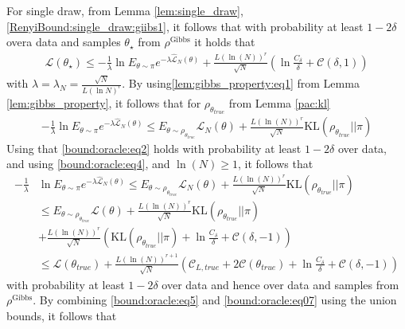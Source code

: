 \documentclass{article}
\newcommand{\KL}{\mathrm{KL}}
\renewcommand{\KL}{\mathrm{KL}}
\begin{document}
 For single draw, from Lemma \ref{lem:single_draw}, \eqref{RenyiBound:single_draw:giibs1}, it follows that
 with probability at least $1-2\delta$ overa data and samples $\theta_{\star}$ from $\rho^{\text{Gibbs}}$
 it holds that 
 \begin{align}
  \mathcal{L}(\theta_{\star}) \le   -\frac{1}{\lambda} \ln E_{\theta \sim \pi} e^{-\lambda \hat{\mathcal{L}}_N(\theta)} + 
 \frac{L(\ln(N))^{r}}{\sqrt{N}}\left(\ln\frac{C_{\delta}}{\delta} +  \mathcal{C}(\delta,1)\right)
      \label{bound:oracle:eq5}
 \end{align}
 with $\lambda=\lambda_N=\frac{\sqrt{N}}{L(\ln{N})^r}$. 
 By using\eqref{lem:gibbs_property:eq1} from  Lemma \ref{lem:gibbs_property}, 
 it follows that for $\rho_{\theta_{true}}$ from Lemma \ref{pac:kl} 
 \begin{align}
      -\frac{1}{\lambda} \ln E_{\theta \sim \pi} e^{-\lambda \hat{\mathcal{L}}_N(\theta)} \le
       E_{\theta \sim \rho_{\theta_{true}}} \mathcal{\mathcal{L}}_N(\theta) + \frac{L(\ln(N))^{r}}{\sqrt{N}} \KL(\rho_{\theta_{true}} ||\pi) 
      \label{bound:oracle:e61}
\end{align}
Using that \ref{bound:oracle:eq2} holds with probability at least $1-2\delta$ over data, 
 and using \eqref{bound:oracle:eq4},  and $\ln(N) \ge 1$,
it follows that
\begin{align}
-\frac{1}{\lambda} & \ln E_{\theta \sim \pi} e^{-\lambda \hat{\mathcal{L}}_N(\theta)} \le 
       E_{\theta \sim \rho_{\theta_{true}}} \mathcal{\mathcal{L}}_N(\theta) + \frac{L(\ln(N))^{r}}{\sqrt{N}} \KL(\rho_{\theta_{true}} ||\pi)  \nonumber \\
       & \le E_{\theta \sim \rho_{\theta_{true}}} \mathcal{\mathcal{L}}(\theta) + \frac{L(\ln(N))^{r}}{\sqrt{N}} \KL(\rho_{\theta_{true}} ||\pi) \nonumber \\
       &+ \frac{L(\ln(N))^{r}}{\sqrt{N}}\left(\KL(\rho_{\theta_{true}} ||\pi)+\ln\frac{C_{\delta}}{\delta}+\mathcal{C}(\delta,-1)\right) \nonumber \\
       &  
        \le \mathcal{L}(\theta_{true})+\frac{L(\ln(N))^{r+1}}{\sqrt{N}} \left(\mathcal{C}_{L,true} + 2\mathcal{C}(\theta_{true}) + \ln\frac{C_{\delta}}{\delta} + \mathcal{C}(\delta,-1)\right)
       \label{bound:oracle:eq07}
\end{align}
with probability at least $1-2\delta$ over data and hence over data and samples from $\rho^{\text{Gibbs}}$.
By combining \eqref{bound:oracle:eq5} and \eqref{bound:oracle:eq07} using the union bounds, it follows that
\end{document}
